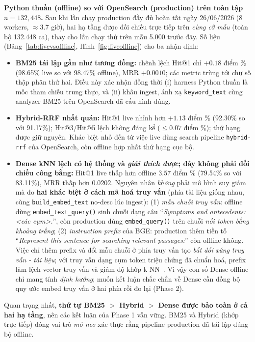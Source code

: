 \textbf{Python thuần (offline) so với OpenSearch (production) trên toàn tập $n=132{,}448$.} Sau khi lần chạy production đầy đủ hoàn tất ngày 26/06/2026 (8 workers, $\approx 3.7$ giờ), hai hạ tầng được đối chiếu trực tiếp trên \emph{cùng cỡ mẫu} (toàn bộ 132.448 ca), thay cho lần chạy thử trên mẫu 5.000 trước đây. Số liệu (Bảng~\ref{tab:livevsoffline}, Hình~\ref{fig:liveoffline}) cho ba nhận định:
\begin{itemize}
    \item \textbf{BM25 tái lập gần như tương đồng:} chênh lệch Hit@1 chỉ $+0.18$ điểm \% (98.65\% live so với 98.47\% offline), MRR $+0.0010$; các metric trùng tới chữ số thập phân thứ hai. Điều này xác nhận đồng thời (i) harness Python thuần là mốc tham chiếu trung thực, và (ii) khâu ingest, ánh xạ \texttt{keyword\_text} cùng analyzer BM25 trên OpenSearch đã cấu hình đúng.
    \item \textbf{Hybrid-RRF nhất quán:} Hit@1 live nhỉnh hơn $+1.13$ điểm \% (92.30\% so với 91.17\%); Hit@3/Hit@5 lệch không đáng kể ($\le 0.07$ điểm \%); thứ hạng được giữ nguyên. Khác biệt nhỏ đến từ việc live dùng search pipeline \texttt{hybrid-rrf} của OpenSearch, còn offline hợp nhất thứ hạng cục bộ.
    \item \textbf{Dense kNN lệch có hệ thống và \emph{giải thích được}; đây không phải đối chiếu công bằng:} Hit@1 live thấp hơn offline $3.57$ điểm \% (79.54\% so với 83.11\%), MRR thấp hơn $0.0202$. Nguyên nhân \emph{không} phải mô hình suy giảm mà do \textbf{hai khác biệt ở cách mã hoá truy vấn} (phía tài liệu giống nhau, cùng \texttt{build\_embed\_text} no-desc lúc ingest): (1) \emph{mẫu chuỗi truy vấn}: offline dùng \texttt{embed\_text\_query()} sinh chuỗi dạng câu ``\textit{Symptoms and antecedents: <các cụm>.}'', còn production dùng \texttt{embed\_query()} trên chuỗi \emph{nối token bằng khoảng trắng}; (2) \emph{instruction prefix} của BGE: production thêm tiền tố ``\textit{Represent this sentence for searching relevant passages:}'' còn offline không. Việc chỉ thêm prefix và đổi mẫu chuỗi ở phía truy vấn tạo \emph{bất đối xứng truy vấn - tài liệu}; với truy vấn dạng cụm token triệu chứng đã chuẩn hoá, prefix làm lệch vector truy vấn và giảm độ khớp k-NN~\cite{xiao2024cpack}. Vì vậy con số Dense offline chỉ mang tính \emph{định hướng}; muốn kết luận chắc chắn về Dense cần đồng bộ quy ước embed truy vấn ở hai phía rồi đo lại (Phase 2).
\end{itemize}
Quan trọng nhất, \textbf{thứ tự BM25 $>$ Hybrid $>$ Dense được bảo toàn ở cả hai hạ tầng}, nên các kết luận của Phase 1 vẫn vững. BM25 và Hybrid (khớp trực tiếp) đóng vai trò \emph{mỏ neo} xác thực rằng pipeline production đã tái lập đúng bộ offline.

